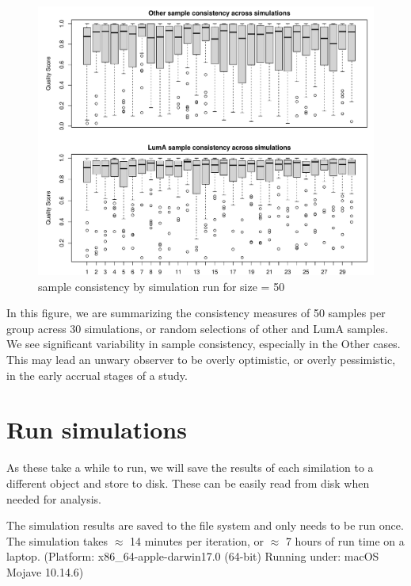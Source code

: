 \documentclass[
]{book}
\begin{document}
\begin{figure}
\centering
\includegraphics{Static/figures/brca-rnaseq-look-sim-qual-0-50ONLY-1.pdf}
\caption{\label{fig:brca-rnaseq-look-sim-qual-0-50ONLY}sample consistency by simulation run for size = 50}
\end{figure}

In this figure, we are summarizing the consistency measures of 50 samples per group acress
30 simulations, or random selections of other and LumA samples.
We see significant variability in sample consistency, especially in the Other cases.
This may lead an unwary observer to be overly optimistic, or overly pessimistic,
in the early accrual stages of a study.

\hypertarget{run-simulations-1}{%
\section{Run simulations}\label{run-simulations-1}}

As these take a while to run,
we will save the results of each similation to a different
object and store to disk. These can be easily read from disk
when needed for analysis.

The simulation results are saved to the file system and
only needs to be run once. The simulation takes \(\approx\) 14 minutes
per iteration, or \(\approx\) 7 hours of run time on a laptop.
(Platform: x86\_64-apple-darwin17.0 (64-bit)
Running under: macOS Mojave 10.14.6)
\end{document}
